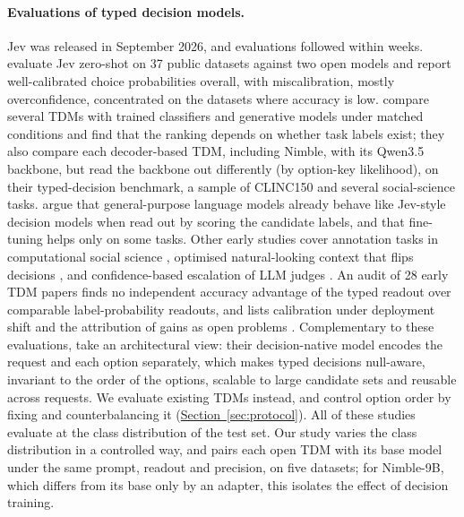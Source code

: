 \paragraph{Evaluations of typed decision models.}
Jev was released in September 2026, and evaluations followed within weeks. \citet{deusser2026jev} evaluate Jev
zero-shot on 37 public datasets against two open models and report well-calibrated choice probabilities overall, with
miscalibration, mostly overconfidence, concentrated on the datasets where accuracy is low.
\citet{rafe2026systemone} compare several TDMs with trained classifiers and generative models under matched conditions
and find that the ranking depends on whether task labels exist; they also compare each decoder-based TDM, including Nimble,
with its Qwen3.5 backbone, but read the backbone out differently (by option-key likelihood), on their typed-decision
benchmark, a sample of CLINC150 and several social-science tasks. \citet{li2026llmasjev} argue that general-purpose
language models already behave like Jev-style decision models when read out by scoring the candidate labels, and that
fine-tuning helps only on some tasks. Other early studies cover annotation tasks in computational social science
\citep{css2026decision}, optimised natural-looking context that flips decisions \citep{jevout2026}, and
confidence-based escalation of LLM judges
\citep{jevjudge2026}. An audit of 28 early TDM papers finds no independent accuracy advantage of the typed readout over
comparable label-probability readouts, and lists calibration under deployment shift and the attribution of gains as
open problems \citep{tang2026audit}. Complementary to these evaluations, \citet{li2026jeva} take an architectural
view: their decision-native model encodes the request and each option separately, which makes typed decisions
null-aware, invariant to the order of the options, scalable to large candidate sets and reusable across requests. We
evaluate existing TDMs instead, and control option order by fixing and counterbalancing it
(\hyperref[sec:protocol]{Section~\ref*{sec:protocol}}). All of these studies evaluate at the class distribution of the
test set. Our
study varies the class distribution in a controlled way, and pairs each open TDM with its base model under the same
prompt, readout and precision, on five datasets; for Nimble-9B, which differs from its base only by an adapter, this
isolates the effect of decision training.

